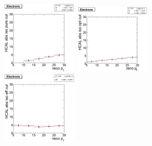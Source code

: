 \begin{figure}[htbp]
   \includegraphics[width = 0.33\textwidth]{pictures/optIsoCut/hcalIso_elec_pure.png}
   \includegraphics[width = 0.33\textwidth]{pictures/optIsoCut/hcalIso_elec_opt.png}
   \includegraphics[width = 0.33\textwidth]{pictures/optIsoCut/hcalIso_elec_eff.png}
   \label{fig:optHcalIso_elec}
\end{figure}

